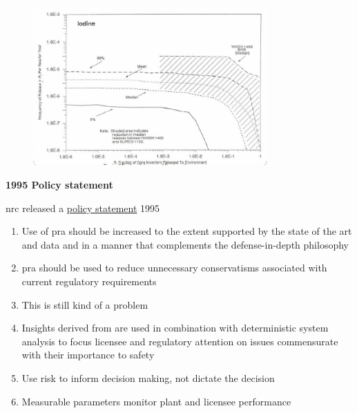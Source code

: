 \documentclass[aspectratio=1610,pdftex,dvipsnames,compress,xcolor={dvipsnames}]{beamer}
\newcommand{\acs}{\acrshort} %
\newcommand{\acsp}{\acrshortpl} %
\begin{document}
\begin{frame}{}
    \begin{figure}
        \centering
        \includegraphics[width=0.80\textwidth]{iodine.release.jpg}
    \end{figure}
\end{frame}


\begin{frame}[plain]{}
    \centering\LARGE\textbf{1995 Policy statement}
\end{frame}


\addtocounter{framenumber}{-1}
\begin{frame}{\acs{nrc} released a \href{https://www.nrc.gov/about-nrc/regulatory/risk-informed/history.html}{policy statement} 1995}
    \begin{enumerate}[series=outerlist,topsep=0pt,itemsep=17pt,leftmargin=*,label=(\arabic*)]
        \item[]Use of \acs{pra} should be increased to the extent supported by the state of the art and data and in a manner that complements the defense-in-depth philosophy
        \item[]\acs{pra} should be used to reduce unnecessary conservatisms associated with current regulatory requirements
        \item[]This is still kind of a problem
        \item[]Insights derived from \acsp{pra} are used in combination with deterministic system analysis to focus licensee and regulatory attention on issues commensurate with their importance to safety
        \item[]Use risk to inform decision making, not dictate the decision
        \item[]Measurable parameters monitor plant and licensee performance
    \end{enumerate}
\end{frame}
\end{document}
